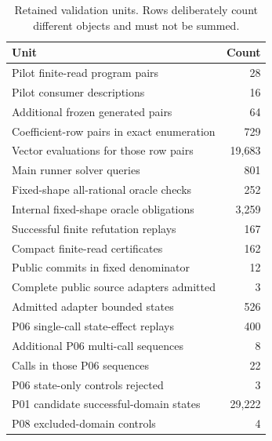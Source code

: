 \begin{table}[t]
\caption{Retained validation units. Rows deliberately count different objects and must not be summed.}\label{tab:validation}
\centering
\begin{tabular}{lr}
\toprule
Unit & Count\\\midrule
Pilot finite-read program pairs & 28\\
Pilot consumer descriptions & 16\\
Additional frozen generated pairs & 64\\
Coefficient-row pairs in exact enumeration & 729\\
Vector evaluations for those row pairs & 19,683\\
Main runner solver queries & 801\\
Fixed-shape all-rational oracle checks & 252\\
Internal fixed-shape oracle obligations & 3,259\\
Successful finite refutation replays & 167\\
Compact finite-read certificates & 162\\
Public commits in fixed denominator & 12\\
Complete public source adapters admitted & 3\\
Admitted adapter bounded states & 526\\
P06 single-call state-effect replays & 400\\
Additional P06 multi-call sequences & 8\\
Calls in those P06 sequences & 22\\
P06 state-only controls rejected & 3\\
P01 candidate successful-domain states & 29,222\\
P08 excluded-domain controls & 4\\
\bottomrule
\end{tabular}
\end{table}
